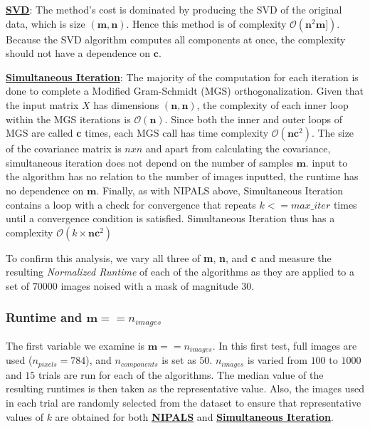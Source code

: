 \documentclass[12pt]{article}
\begin{document}
\textbf{\hyperref[3.2]{SVD}}: The method's cost is dominated by producing the SVD of the original data, which is size $(\textbf{m}, \textbf{n})$. Hence this method is of complexity $\mathcal{O}(\textbf{n}^2 \textbf{m} ])$. Because the SVD algorithm computes all components at once, the complexity should not have a dependence on $\textbf{c}$.

\textbf{\hyperref[3.3]{Simultaneous Iteration}}: The majority of the computation for each iteration is done to complete a Modified Gram-Schmidt (MGS) orthogonalization. Given that the input matrix $X$ has dimensions $(\textbf{n}, \textbf{n})$, the complexity of each inner loop within the MGS iterations is $\mathcal{O}(\textbf{n})$. Since both the inner and outer loops of MGS are called $\textbf{c}$ times, each MGS call has time complexity $\mathcal{O}(\textbf{n}\textbf{c}^2)$. The size of the covariance matrix is $nxn$ and apart from calculating the covariance, simultaneous iteration does not depend on the number of samples $\textbf{m}$. input to the algorithm has no relation to the number of images inputted, the runtime has no dependence on $\textbf{m}$. Finally, as with NIPALS above, Simultaneous Iteration contains a loop with a check for convergence that repeats $k <=max\_iter$ times until a convergence condition is satisfied. Simultaneous Iteration thus has a complexity $\mathcal{O}(k \times \textbf{n}\textbf{c}^2)$

To confirm this analysis, we vary all three of \textbf{m}, \textbf{n}, and \textbf{c} and measure the resulting \textit{Normalized Runtime} of each of the algorithms as they are applied to a set of $70000$ images noised with a mask of magnitude $30$.

\subsubsection{Runtime and $\textbf{m} == n_{images}$}\label{5.1.2}

The first variable we examine is $\textbf{m} == n_{images}$. In this first test, full images are used ($n_{pixels}=784$), and $n_{components}$ is set as $50$. $n_{images}$ is varied from $100$ to $1000$ and $15$ trials are run for each of the algorithms. The median value of the resulting runtimes is then taken as the representative value. Also, the images used in each trial are randomly selected from the dataset to ensure that representative values of $k$ are obtained for both \textbf{\hyperref[3.1]{NIPALS}} and \textbf{\hyperref[3.3]{Simultaneous Iteration}}.
\end{document}
